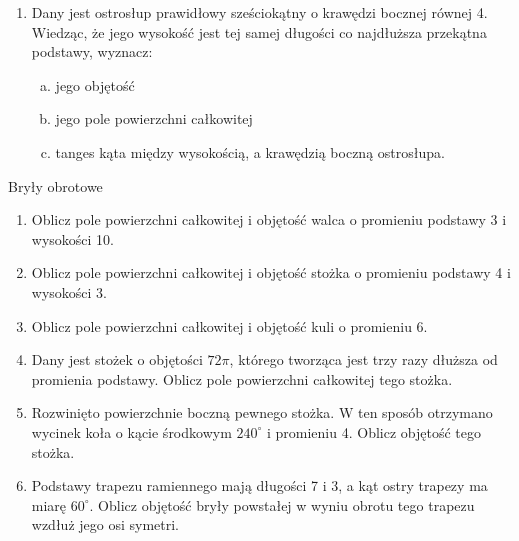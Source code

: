 \documentclass[12pt,a4paper]{article}
\begin{document}
\begin{enumerate}[1.]
	\item Dany jest ostrosłup prawidłowy sześciokątny o krawędzi bocznej równej 4. Wiedząc, że jego wysokość jest tej samej długości co najdłuższa przekątna podstawy, wyznacz:
	\begin{enumerate}[a)]
		\item jego objętość
		\item jego pole powierzchni całkowitej
		\item tanges kąta między wysokością, a krawędzią boczną ostrosłupa.
	\end{enumerate}

	\end{enumerate}

	\newpage
	
	\begin{center}
	\large Bryły obrotowe
\end{center}

\begin{enumerate}[1.]
	\item Oblicz pole powierzchni całkowitej i objętość walca o promieniu podstawy 3 i wysokości 10.
	
	\item Oblicz pole powierzchni całkowitej i objętość stożka o promieniu podstawy 4 i wysokości 3.
	
	\item Oblicz pole powierzchni całkowitej i objętość kuli o promieniu 6.
	
	\item Dany jest stożek o objętości $72\pi$, którego tworząca jest trzy razy dłuższa od promienia podstawy. Oblicz pole powierzchni całkowitej tego stożka.
	
	\item Rozwinięto powierzchnie boczną pewnego stożka. W ten sposób otrzymano wycinek koła o kącie środkowym $240^\circ$ i promieniu 4. Oblicz objętość tego stożka.
	
	\item Podstawy trapezu ramiennego mają długości 7 i 3, a kąt ostry trapezy ma miarę $60^\circ$. Oblicz objętość bryły powstałej w wyniu obrotu tego trapezu wzdłuż jego osi symetri.
\end{enumerate}
\end{document}
